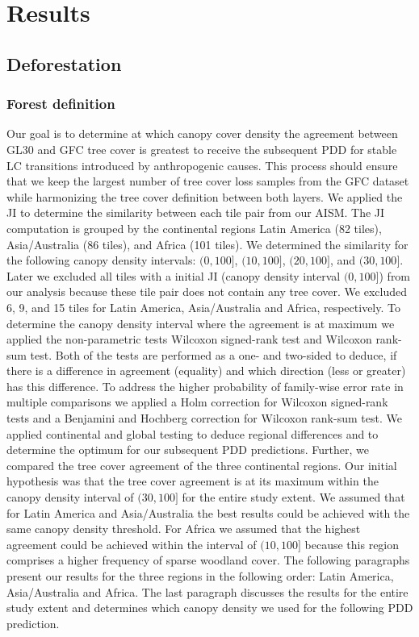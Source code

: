 \chapter{Results}
\label{ch:results}

	\section{Deforestation}
	\label{sec:results_deforestation}

		\subsection{Forest definition}
		\label{subsec:results_forest_definition}
			Our goal is to determine at which canopy cover density the agreement between \ac{GL30} and \ac{GFC} tree cover is greatest to receive the subsequent \ac{PDD} for stable \ac{LC} transitions introduced by anthropogenic causes. This process should ensure that we keep the largest number of tree cover loss samples from the \ac{GFC} dataset while harmonizing the tree cover definition between both layers. We applied the \ac{JI} to determine the similarity between each tile pair from our \ac{AISM}. The \ac{JI} computation is grouped by the continental regions Latin America (82 tiles), Asia/Australia (86 tiles), and Africa (101 tiles). We determined the similarity for the following canopy density intervals: $(0, 100]$, $(10, 100]$, $(20, 100]$, and $(30, 100]$. Later we excluded all tiles with a initial \ac{JI} (canopy density interval $(0,100]$) from our analysis because these tile pair does not contain any tree cover. We excluded 6, 9, and 15 tiles for Latin America, Asia/Australia and Africa, respectively. To determine the canopy density interval where the agreement is at maximum we applied the non-parametric tests Wilcoxon signed-rank test and Wilcoxon rank-sum test. Both of the tests are performed as a one- and two-sided to deduce, if there is a difference in agreement (equality) and which direction (less or greater) has this difference. To address the higher probability of family-wise error rate in multiple comparisons we applied a Holm correction for Wilcoxon signed-rank tests and a Benjamini and Hochberg correction for Wilcoxon rank-sum test. We applied continental and global testing to deduce regional differences and to determine the optimum for our subsequent \ac{PDD} predictions. Further, we compared the tree cover agreement of the three continental regions. Our initial hypothesis was that the tree cover agreement is at its maximum within the canopy density interval of $(30,100]$ for the entire study extent. We assumed that for Latin America and Asia/Australia the best results could be achieved with the same canopy density threshold. For Africa we assumed that the highest agreement could be achieved within the interval of $(10,100]$ because this region comprises a higher frequency of sparse woodland cover. The following paragraphs present our results for the three regions in the following order: Latin America, Asia/Australia and Africa. The last paragraph discusses the results for the entire study extent and determines which canopy density we used for the following \ac{PDD} prediction.

